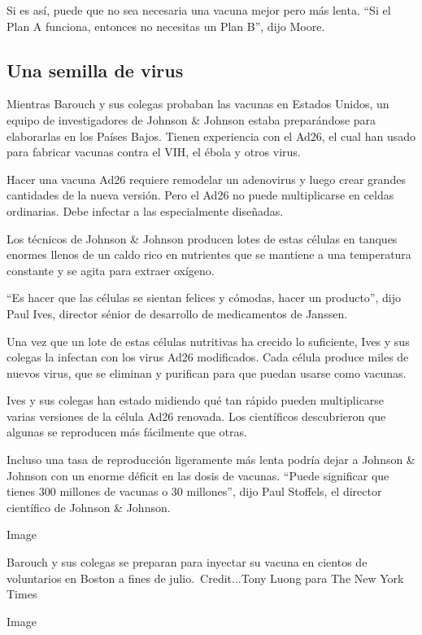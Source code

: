 Si es así, puede que no sea necesaria una vacuna mejor pero más lenta.
``Si el Plan A funciona, entonces no necesitas un Plan B'', dijo Moore.

\hypertarget{una-semilla-de-virus}{%
\subsection{Una semilla de virus}\label{una-semilla-de-virus}}

Mientras Barouch y sus colegas probaban las vacunas en Estados Unidos,
un equipo de investigadores de Johnson \& Johnson estaba preparándose
para elaborarlas en los Países Bajos. Tienen experiencia con el Ad26, el
cual han usado para fabricar vacunas contra el VIH, el ébola y otros
virus.

Hacer una vacuna Ad26 requiere remodelar un adenovirus y luego crear
grandes cantidades de la nueva versión. Pero el Ad26 no puede
multiplicarse en celdas ordinarias. Debe infectar a las especialmente
diseñadas.

Los técnicos de Johnson \& Johnson producen lotes de estas células en
tanques enormes llenos de un caldo rico en nutrientes que se mantiene a
una temperatura constante y se agita para extraer oxígeno.

``Es hacer que las células se sientan felices y cómodas, hacer un
producto'', dijo Paul Ives, director sénior de desarrollo de
medicamentos de Janssen.

Una vez que un lote de estas células nutritivas ha crecido lo
suficiente, Ives y sus colegas la infectan con los virus Ad26
modificados. Cada célula produce miles de nuevos virus, que se eliminan
y purifican para que puedan usarse como vacunas.

Ives y sus colegas han estado midiendo qué tan rápido pueden
multiplicarse varias versiones de la célula Ad26 renovada. Los
científicos descubrieron que algunas se reproducen más fácilmente que
otras.

Incluso una tasa de reproducción ligeramente más lenta podría dejar a
Johnson \& Johnson con un enorme déficit en las dosis de vacunas.
``Puede significar que tienes 300 millones de vacunas o 30 millones'',
dijo Paul Stoffels, el director científico de Johnson \& Johnson.

Image

Barouch y sus colegas se preparan para inyectar su vacuna en cientos de
voluntarios en Boston a fines de julio.~Credit...Tony Luong para The New
York Times

Image

